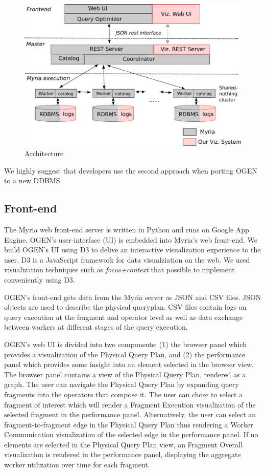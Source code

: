 \documentclass{chi2009}
\newcommand*{\system}{OGEN\xspace}
\newcommand*{\graph}{Physical Query Plan\xspace}
\newcommand*{\fragment}{Fragment Execution\xspace}
\newcommand*{\network}{Worker Communication\xspace}
\newcommand*{\overall}{Fragment Overall\xspace}
\begin{document}
\begin{figure}[ht]
  \includegraphics[width=\columnwidth]{viz_arch}
  \caption{Architecture}
  \label{fig:arch}
\end{figure}

We highly suggest that developers use the second approach when porting \system to a new DDBMS.

\subsection{Front-end}
The Myria web front-end server is written in Python and runs on Google App Engine. \system's user-interface (UI) is embedded into Myria's web front-end. We build \system's UI using D3 to delive an interactive visualization experience to the user. D3 is a JavaScript framework for data visualziation on the web. We used visualization techniques such as \emph{focus+context} that possible to implement conveniently using D3.

\system's front-end gets data from the Myria server as JSON and CSV files. JSON objects are used to describe the physical queryplan. CSV files contain logs on query execution at the fragment and operator level as well as data exchange between workers at different stages of the query execution.

\system's web UI is divided into two components: (1) the browser panel which provides a visualization of the \graph, and (2) the performance panel which provides some insight into an element selected in the browser view. The browser panel contains a view of the \graph, rendered as a graph. The user can navigate the \graph by expanding query fragments into the operators that compose it. The user can chose to select a fragment of interest which will render a \fragment visualization of the selected fragment in the performance panel. Alternatively, the user can select an fragment-to-fragment edge in the \graph thus rendering a \network visualization of the selected edge in the performance panel. If no elements are selected in the \graph view, an \overall visualization is rendered in the performance panel, displaying the aggregate worker utilization over time for each fragment.
\end{document}
